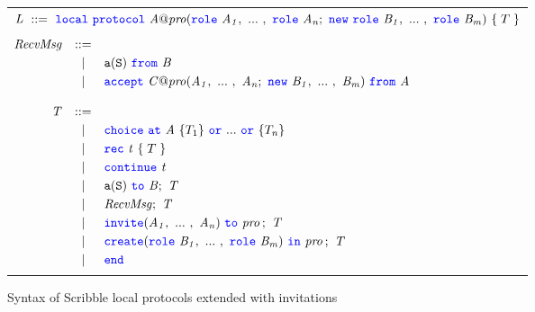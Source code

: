 \documentclass[12pt,twoside]{report}
\begin{document}

\begin{figure}[h!]
    \begin{center}
        \begin{tabular}{l}
            $\mathit{L}\ ::=\ {\color{blue}\mathtt{local}}\ {\color{blue}\mathtt{protocol}}\ \mathit{A@pro}({\color{blue}\mathtt{role}}\ \mathit{A_1},\ ...\ ,\ {\color{blue}\mathtt{role}}\ \mathit{A_n};\ {\color{blue}\mathtt{new}}\ {\color{blue}\mathtt{role}}\ \mathit{B_1},\ ...\ ,\ {\color{blue}\mathtt{role}}\ \mathit{B_m})\ \{\;T\;\}$ \\\\
            \begin{math}
                \begin{array}{@{}rcl}
                    \mathit{RecvMsg} & ::= & \\[2.75pt]
                     & | & \messageFromL{a}{S}{B}\\[2.75pt]
                     & | & \acceptL{C@pro}{A}{B}{A}\\\\
        
                    \mathit{T} & ::= &\\[2.75pt]
                      &   | & \choice\ \at\ \mathit{A}\ \{T_1\}\ \scror\ ...\ \scror\ \{T_n\} \\[2.75pt]
                      &   | & \rec\ \mathit{t}\ \{\;T\;\} \\[2.75pt]
                      &   | &  \continue\ \mathit{t} \\[2.75pt]
                      &   | & \scrmessage{a}{S}\ \scrto\ \mathit{B};\ \mathit{T} \\[2.75pt]
                      &   | & \mathit{RecvMsg};\ \mathit{T}\\[2.75pt]
                      &   | & \invite(\roles{A}{n})\ \scrto\ \mathit{pro}\,;\ \mathit{T} \\[2.75pt]
                      &   | & \create(\rolessig{B}{m})\ \scrin\ \mathit{pro}\,;\ \mathit{T}\\[2.75pt]
                    &   | & \scrend \\[2.75pt]
                \end{array}
            \end{math}
        \end{tabular}
    \end{center}
    \caption{Syntax of Scribble local protocols extended with invitations}
    \label{scr-local-protocols-syntax}
\end{figure}
\end{document}
